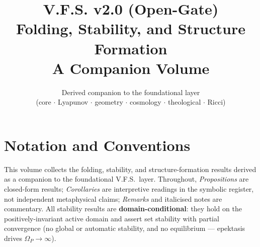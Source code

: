 \documentclass[11pt,a4paper,oneside]{book}
\title{\textbf{\Huge V.F.S. v2.0 (Open-Gate)}\\[1.2em]
{\LARGE Folding, Stability, and Structure Formation}\\[0.6em]
{\large A Companion Volume}}
\author{Derived companion to the foundational layer\\
\small (core $\cdot$ Lyapunov $\cdot$ geometry $\cdot$ cosmology $\cdot$ theological $\cdot$ Ricci)}
\date{}
\newcommand{\Op}{\Omega_P}
\theoremstyle{plain}
\theoremstyle{definition}
\theoremstyle{remark}
\begin{document}
\frontmatter

\maketitle

\tableofcontents

\cleardoublepage

\chapter*{Notation and Conventions}

This volume collects the folding, stability, and structure-formation results derived as a companion to the
foundational V.F.S.\ layer. Throughout, \emph{Propositions} are closed-form results; \emph{Corollaries}
are interpretive readings in the symbolic register, not independent metaphysical claims; \emph{Remarks}
and italicised notes are commentary. All stability results are \textbf{domain-conditional}: they hold on
the positively-invariant active domain and assert set stability with partial convergence (no global or
automatic stability, and no equilibrium --- epektasis drives $\Op\to\infty$).
\end{document}
